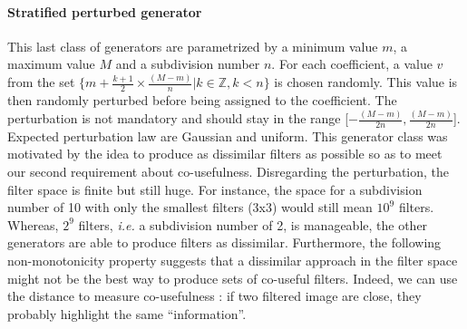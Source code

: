\documentclass[a4paper]{report}
\begin{document}
			\paragraph{Stratified perturbed generator}
			This last class of generators are parametrized by a minimum value $m$, a maximum value $M$ and a subdivision number $n$. For each coefficient, a value $v$ from the set $\{m + \frac{k+1}{2} \times \frac{(M-m)}{n} | k \in \mathbb{Z}, k < n\}$ is chosen randomly.  This value is then randomly perturbed before being assigned to the coefficient. The perturbation is not mandatory and should stay in the range [$-\frac{(M-m)}{2n}, \frac{(M-m)}{2n}$]. Expected perturbation law are Gaussian and uniform.
			This generator class was motivated by the idea to produce as dissimilar filters as possible so as to meet our second requirement about co-usefulness. Disregarding the perturbation, the filter space is finite but still huge. For instance, the space for a subdivision number of 10 with only the smallest filters (3x3) would still mean $10^9$ filters.  Whereas, $2^9$ filters, \textit{i.e.} a subdivision number of 2, is manageable, the other generators are able to produce filters as dissimilar. Furthermore, the following non-monotonicity property suggests that a dissimilar approach in the filter space might not be the best way to produce sets of co-useful filters. Indeed, we can use the distance to measure co-usefulness : if two filtered image are close, they probably highlight the same ``information''.
			
\end{document}
